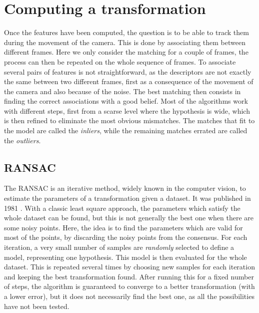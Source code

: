 \section{Computing a transformation}

Once the features have been computed, the question is to be able to track them during the movement of the camera. This is done by associating them between different frames. Here we only consider the matching for a couple of frames, the process can then be repeated on the whole sequence of frames. To associate several pairs of features is not straightforward, as the descriptors are not exactly the same between two different frames, first as a consequence of the movement of the camera and also because of the noise. The best matching then consists in finding the correct associations with a good belief. Most of the algorithms work with different steps, first from a scarse level where the hypothesis is wide, which is then refined to eliminate the most obvious mismatches. The matches that fit to the model are called the \emph{inliers}, while the remaining matches errated are called the \emph{outliers}.

\subsection{RANSAC}
\label{sub:ransac}

The \gls{RANSAC} is an iterative method, widely known in the computer vision, to estimate the parameters of a transformation given a dataset. It was published in 1981 \cite{FischlerB81}. With a classic least square approach, the parameters which satisfy the whole dataset can be found, but this is not generally the best one when there are some noisy points. Here, the idea is to find the parameters which are valid for most of the points, by discarding the noisy points from the consensus. For each iteration, a very small number of samples are \emph{randomly} selected to define a model, representing one hypothesis. This model is then evaluated for the whole dataset. This is repeated several times by choosing new samples for each iteration and keeping the best transformation found. After running this for a fixed number of steps, the algorithm is guaranteed to converge to a better transformation (with a lower error), but it does not necessarily find the best one, as all the possibilities have not been tested. 

